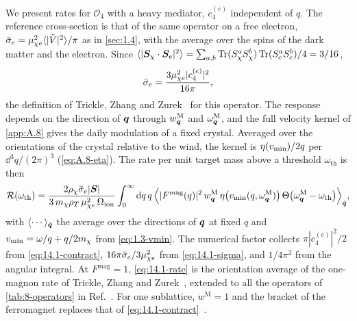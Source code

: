 We present rates for $\mathcal{O}_4$ with a heavy mediator, $c_4^{(e)}$ independent of $q$. The reference cross-section is that of the same operator on a free electron, $\bar{\sigma}_{e} = \mu_{\chi e}^2\langle|\tilde V|^2\rangle/\pi$ as in \cref{sec:1.4}, with the average over the spins of the dark matter and the electron. Since $\langle|\bm{S}_\chi\cdot\bm{S}_e|^2\rangle = \sum_{a,b}\operatorname{Tr}(S^a_\chi S^b_\chi)\operatorname{Tr}(S^a_eS^b_e)/4 = 3/16$,
\begin{equation}
  \bar{\sigma}_{e} = \frac{3\mu_{\chi e}^2|c_4^{(e)}|^2}{16\pi} ,
  \label{eq:14.1-sigma}
\end{equation}
the definition of Trickle, Zhang and Zurek~\cite[Eq.~(11)]{trickle2020detecting} for this operator. The response depends on the direction of $\bm{q}$ through $w^{\mathrm{M}}_{\bm{q}}$ and $\omega^{\mathrm{M}}_{\bm{q}}$, and the full velocity kernel of \cref{app:A.8} gives the daily modulation of a fixed crystal. Averaged over the orientations of the crystal relative to the wind, the kernel is $\eta(v_{\mathrm{min}})/2q$ per $\dd^3q/(2\pi)^3$ (\cref{eq:A.8-eta}). The rate per unit target mass above a threshold $\omega_{\mathrm{th}}$ is then
\begin{equation}
  \mathcal{R}(\omega_{\mathrm{th}}) = \frac{2\rho_\chi\bar{\sigma}_{e}|\bm{S}|}{3\,m_{\chi}\rho_T\,\mu_{\chi e}^2\,\Omega_{\mathrm{ion}}}\int_0^{\infty}\mathrm{d} q\,q\,\Bigl\langle|F^{\mathrm{mag}}(q)|^2\,w^{\mathrm{M}}_{\bm{q}}\,\eta\bigl(v_{\mathrm{min}}(q,\omega^{\mathrm{M}}_{\bm{q}})\bigr)\,\Theta\bigl(\omega^{\mathrm{M}}_{\bm{q}} - \omega_{\mathrm{th}}\bigr)\Bigr\rangle_{\hat{\bm{q}}} ,
  \label{eq:14.1-rate}
\end{equation}
with $\langle\cdots\rangle_{\hat{\bm{q}}}$ the average over the directions of $\bm{q}$ at fixed $q$ and $v_{\mathrm{min}} = \omega/q + q/2m_{\chi}$ from \cref{eq:1.3-vmin}. The numerical factor collects $\pi|c_4^{(e)}|^2/2$ from \cref{eq:14.1-contract}, $16\pi\bar{\sigma}_{e}/3\mu_{\chi e}^2$ from \cref{eq:14.1-sigma}, and $1/4\pi^2$ from the angular integral. At $F^{\mathrm{mag}} = 1$, \cref{eq:14.1-rate} is the orientation average of the one-magnon rate of Trickle, Zhang and Zurek~\cite[Eqs.~(5)--(10)]{trickle2020detecting}, extended to all the operators of \cref{tab:8-operators} in Ref.~\cite[Eqs.~(34) and~(38)]{trickle2022effective}. For one sublattice, $w^{\mathrm{M}} = 1$ and the bracket of the ferromagnet replaces that of \cref{eq:14.1-contract}~\cite[Eq.~(12)]{trickle2020detecting}.

